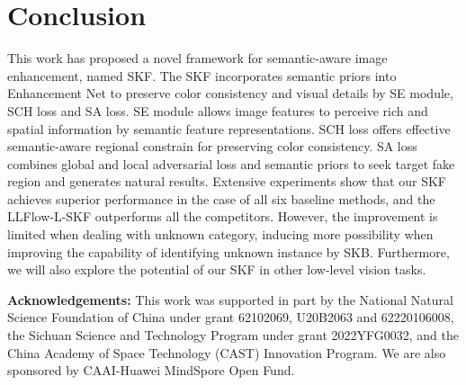 \documentclass[10pt,twocolumn,letterpaper]{article}
\begin{document}
\vspace{-0.1cm}
\section{Conclusion}
\vspace{-0.1cm}
This work has proposed a novel framework for semantic-aware image enhancement, named SKF. The SKF incorporates semantic priors into Enhancement Net to preserve color consistency and visual details by SE module, SCH loss and SA loss. SE module allows image features to perceive rich and spatial information by semantic feature representations. SCH loss offers effective semantic-aware regional constrain for preserving color consistency. SA loss combines global and local adversarial loss and semantic priors to seek target fake region and generates natural results. Extensive experiments show that our SKF achieves superior performance in the case of all six baseline methods, and the LLFlow-L-SKF outperforms all the competitors. However, the improvement is limited when dealing with unknown category, inducing more possibility when improving the capability of identifying unknown instance by SKB. Furthermore, we will also explore the potential of our SKF in other low-level vision tasks.

\vspace{0.1cm}
\noindent \textbf{Acknowledgements:} This work was supported in part by the National Natural Science Foundation of China under grant 62102069, U20B2063 and 62220106008, the Sichuan Science and Technology Program under grant 2022YFG0032, and the China Academy of Space Technology (CAST) Innovation Program. We are also sponsored by
CAAI-Huawei MindSpore Open Fund.

{\small


}
\end{document}
